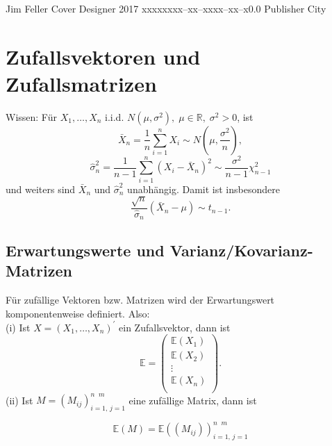 \documentclass{tstextbook}
\begin{document}
       {Jim Feller}
       {Cover Designer}
       {2017}
       {xxxxx}{xxx--xx--xxxx--xx--x}{0.0}
       {Publisher}
       {City}



\chapter{Zufallsvektoren und Zufallsmatrizen}

\begin{remark}
	Wissen: Für $ X_1, \ldots ,X_n $ i.i.d. $ N(\mu,\sigma^{2}), \; \mu\in\mathbb{R}, \; \sigma^2 > 0 $, ist 
	\[ \bar{X}_n = \frac{1}{n} \sum_{i=1}^{n} X_i \sim N\left(\mu, \frac{\sigma^2}{n} \right),
	\] 
	\[ \hat{\sigma}_n^2 = \frac{1}{n-1} \sum_{i=1}^{n} ( X_i - \bar{X}_n)^2 \sim \frac{\sigma^2}{n-1} \chi_{n-1}^2 
	\]  
	und weiters sind $ \bar{X}_n $  und $ \hat{\sigma}^2_n $ unabhängig. Damit ist insbesondere 
	\[ \frac{\sqrt{n}}{\hat{\sigma}_n}(\bar{X}_n-\mu) \sim t_{n-1}.
	\]
	
\end{remark}
 
 
 


\section{Erwartungswerte und Varianz/Kovarianz-Matrizen}


\begin{definition}[Erwartungswert]
	Für zufällige Vektoren bzw. Matrizen wird der Erwartungswert komponentenweise definiert. Also: \\
	(i) Ist $ X= \left(X_1, \ldots ,X_n\right)^\prime $  ein Zufallsvektor, dann ist 
\[ \mathbb{E} = \begin{pmatrix} \mathbb{E}(X_1)\\
		\mathbb{E}(X_2)\\
		\vdots\\
		\mathbb{E}(X_n)\\
	\end{pmatrix}.
\]
	(ii) Ist $ M=(M_{ij})_{i=1,\, j=1}^{n \;\; m} $ eine zufällige Matrix, dann ist 
	
\[ 
\mathbb{E}(M)= \mathbb{E} \left((M_{ij})\right)_{i=1,\, j=1}^{n \;\; m}	
\]
\end{definition}
\end{document}
